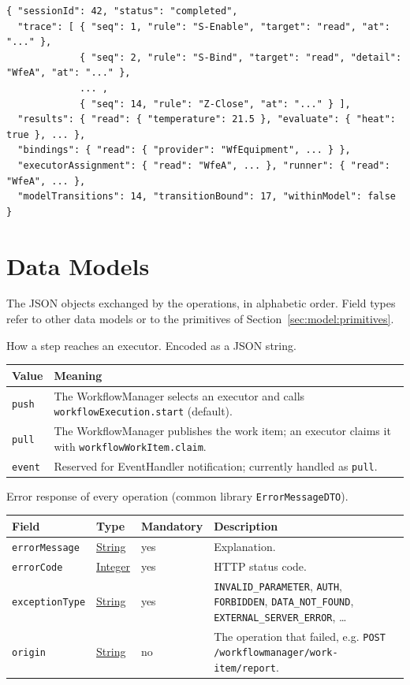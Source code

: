 \documentclass[a4paper]{arrowhead}
\newcommand{\pref}[1]{{\textcolor{ArrowheadGrey}{\hyperref[sec:model:primitives:#1]{#1}}}}
\begin{document}
\begin{lstlisting}[caption={Example response body}]
{ "sessionId": 42, "status": "completed",
  "trace": [ { "seq": 1, "rule": "S-Enable", "target": "read", "at": "..." },
             { "seq": 2, "rule": "S-Bind", "target": "read", "detail": "WfeA", "at": "..." },
             ... ,
             { "seq": 14, "rule": "Z-Close", "at": "..." } ],
  "results": { "read": { "temperature": 21.5 }, "evaluate": { "heat": true }, ... },
  "bindings": { "read": { "provider": "WfEquipment", ... } },
  "executorAssignment": { "read": "WfeA", ... }, "runner": { "read": "WfeA", ... },
  "modelTransitions": 14, "transitionBound": 17, "withinModel": false }
\end{lstlisting}


\newpage
\section{Data Models}
\label{sec:model}
The JSON objects exchanged by the operations, in alphabetic order. Field types refer to other data models or to the
primitives of Section~\ref{sec:model:primitives}.

How a step reaches an executor.
 Encoded as a JSON string.
{\small
\begin{longtable}{|p{3.9cm}|p{11.9cm}|}

\hline
\rowcolor{gray!33} Value & Meaning \\ \hline
\endhead
\texttt{push} & The WorkflowManager selects an executor and calls \texttt{workflowExecution.start} (default). \\ \hline
\texttt{pull} & The WorkflowManager publishes the work item; an executor claims it with \texttt{workflowWorkItem.claim}. \\ \hline
\texttt{event} & Reserved for EventHandler notification; currently handled as \texttt{pull}. \\ \hline
\end{longtable}
}

Error response of every operation (common library \texttt{ErrorMessageDTO}).

{\small
\begin{longtable}{|p{3.7cm}|p{4.2cm}|p{1.6cm}|p{6.3cm}|}

\hline
\rowcolor{gray!33} Field & Type & Mandatory & Description \\ \hline
\endhead
\texttt{errorMessage} & \pref{String} & yes & Explanation. \\ \hline
\texttt{errorCode} & \pref{Integer} & yes & HTTP status code. \\ \hline
\texttt{exceptionType} & \pref{String} & yes & \texttt{INVALID\_PARAMETER}, \texttt{AUTH}, \texttt{FORBIDDEN}, \texttt{DATA\_NOT\_FOUND}, \texttt{EXTERNAL\_SERVER\_ERROR}, \ldots \\ \hline
\texttt{origin} & \pref{String} & no & The operation that failed, e.g. \texttt{POST /workflowmanager/work-item/report}. \\ \hline
\end{longtable}
}
\end{document}

